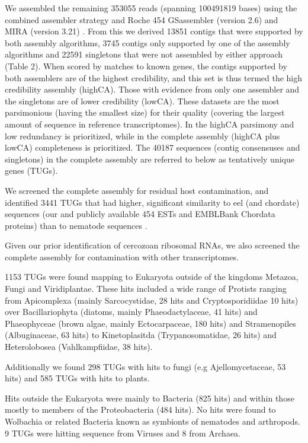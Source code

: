 \documentclass[10pt]{bmc_article}
\newenvironment{bmcformat}{\begin{raggedright}\baselineskip20pt\sloppy\setboolean{publ}{false}}{\end{raggedright}\baselineskip20pt\sloppy}
\begin{document}
\begin{bmcformat}
We assembled the remaining 353055 reads (spanning
100491819 bases) using the combined assembler strategy
\cite{pmid20950480} and Roche 454 GSassembler (version 2.6) and MIRA
(version 3.21) \cite{miraEST}. From this we derived 13851
contigs that were supported by both assembly algorithms,
3745 contigs only supported by one of the assembly
algorithms and 22591 singletons that were not assembled by
either approach (Table 2). When scored by matches to known genes, the
contigs supported by both assemblers are of the highest credibility,
and this set is thus termed the high credibility assembly
(highCA). Those with evidence from only one assembler and the
singletons are of lower credibility (lowCA). These datasets are the
most parsimonious (having the smallest size) for their quality
(covering the largest amount of sequence in reference
transcriptomes). In the highCA parsimony and low redundancy is
prioritized, while in the complete assembly (highCA plus lowCA)
completeness is prioritized. The 40187 sequences (contig consensuses
and singletons) in the complete assembly are referred to below as
tentatively unique genes (TUGs).




We screened the complete assembly for residual host contamination, and
identified 3441 TUGs that had higher, significant similarity
to eel (and chordate) sequences (our and publicly available 454 ESTs
and EMBLBank Chordata proteins) than to nematode sequences
\cite{pmid21550347}.

Given our prior identification of cercozoan ribosomal RNAs, we also
screened the complete assembly for contamination with other
transcriptomes.

1153 TUGs were found mapping to Eukaryota outside of the kingdoms
Metazoa, Fungi and Viridiplantae. These hits included a wide range of
Protists ranging from Apicomplexa (mainly Sarcocystidae, 28 hits and
Cryptosporidiidae 10 hits) over Bacillariophyta (diatoms, mainly
Phaeodactylaceae, 41 hits) and Phaeophyceae (brown algae, mainly
Ectocarpaceae, 180 hits) and Stramenopiles (Albuginaceae, 63 hits) to
Kinetoplasitda (Trypanosomatidae, 26 hits) and Heterolobosea
(Vahlkampfiidae, 38 hits).

Additionally we found 298 TUGs with hits to
fungi (e.g Ajellomycetaceae, 53 hits) and
585 TUGs with hits to plants.

Hits outside the Eukaryota were mainly to Bacteria (825 hits) and
within those mostly to members of the Proteobacteria (484 hits). No
hits were found to Wolbachia or related Bacteria known as symbionts of
nematodes and arthropods. 9 TUGs were hitting sequence from Viruses and
8 from Archaea.


\end{bmcformat}
\end{document}
